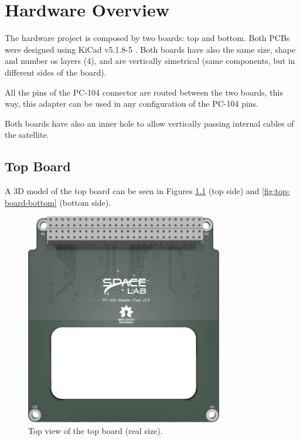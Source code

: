 %
%
%
%
%

%
%
%
%
%
%

\chapter{Hardware Overview} \label{ch:hardware}

The hardware project is composed by two boards: top and bottom. Both PCBs were designed using KiCad v5.1.8-5 \cite{kicad}. Both boards have also the same size, shape and number os layers (4), and are vertically simetrical (same components, but in different sides of the board).

All the pins of the PC-104 connector are routed between the two boards, this way, this adapter can be used in any configuration of the PC-104 pins.

Both boards have also an inner hole to allow vertically passing internal cables of the satellite.

\section{Top Board}

A 3D model of the top board can be seen in Figures \ref{fig:top-board-top} (top side) and \ref{fig:top-board-bottom} (bottom side).

\begin{figure}[!htb]
    \begin{center}
        \includegraphics[width=8.636cm]{figures/pc104-adapter-top-top}
        \caption{Top view of the top board (real size).}
        \label{fig:top-board-top}
    \end{center}
\end{figure}


